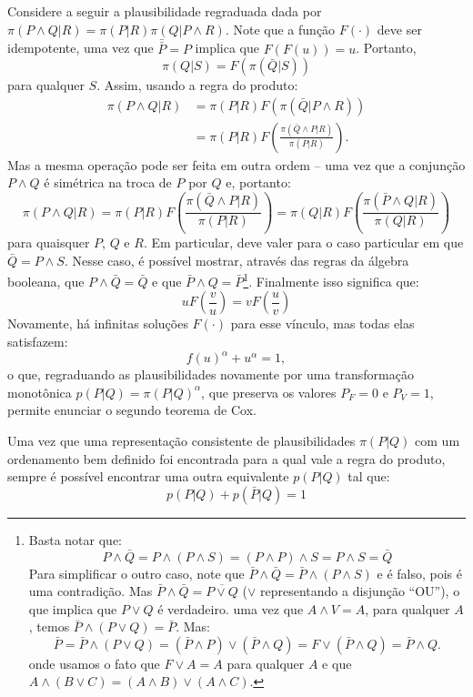 Considere a seguir a plausibilidade regraduada dada por $\pi(P \wedge Q | R) = \pi(P|R) \pi(Q|P \wedge R)$. Note que a função $F(\cdot)$ deve ser idempotente, uma vez que $\bar{\bar{P}} = P$ implica que $F(F(u)) = u$. Portanto, 
\[
\pi(Q|S) = F(\pi(\bar{Q}|S)) 
\]
para qualquer $S$. Assim, usando a regra do produto:
\begin{align}
\pi(P\wedge Q | R) &= \pi(P|R) F\left(\pi(\bar{Q}|P\wedge R)\right) \\
&= \pi(P|R) F\left(\frac{\pi(\bar{Q}\wedge P|R)}{\pi(P|R)}\right).
\end{align}
Mas a mesma operação pode ser feita em outra ordem -- uma vez que a conjunção $P\wedge Q$ é simétrica na troca de $P$ por $Q$ e, portanto:
\[
\pi(P\wedge Q | R) = \pi(P|R) F\left(\frac{\pi(\bar{Q}\wedge P|R)}{\pi(P|R)}\right) = \pi(Q|R) F\left(\frac{\pi(\bar{P}\wedge Q|R)}{\pi(Q|R)}\right)
\]
para quaisquer $P$, $Q$ e $R$. Em particular, deve valer para o caso particular em que $\bar{Q} = {P\wedge S}$. Nesse caso, é possível mostrar, através das regras da álgebra booleana, que $P\wedge\bar{Q} = \bar{Q}$ e que $\bar{P}\wedge Q = \bar{P}$\footnote{Basta notar que:
\[
  P\wedge\bar{Q} = P \wedge (P\wedge S)= (P \wedge P)\wedge S = P\wedge S = \bar{Q}
\]
Para simplificar o outro caso, note que $\bar{P}\wedge \bar{Q} =\bar{P}\wedge (P\wedge S)$ e é falso, pois é uma contradição. Mas $\bar{P}\wedge \bar{Q} = \overline{P\vee Q}$ ($\vee$ representando a disjunção ``OU''), o que implica que $P\vee Q$ é verdadeiro. uma vez que $A\wedge V = A$, para qualquer $A$, temos $\bar{P}\wedge(P\vee Q) = \bar{P}$. Mas:
\[
\bar{P} = \bar{P}\wedge(P\vee Q) = (\bar{P}\wedge P) \vee (\bar{P}\wedge Q) = F \vee (\bar{P} \wedge Q) = \bar{P} \wedge Q.
\]
onde usamos o fato que $F \vee A = A$ para qualquer $A$ e que $A\wedge (B\vee C) = (A\wedge B) \vee (A\wedge C)$.}. Finalmente isso significa que:
\[
u F\left(\frac{v}{u}\right) = v F\left(\frac{u}{v}\right)
\]
Novamente, há infinitas soluções $F(\cdot)$ para esse vínculo, mas todas elas satisfazem\cite{Aczel1975, ACaticha2008}:
\begin{equation}
 f(u)^\alpha + u^\alpha = 1, 
\end{equation}
o que, regraduando as plausibilidades novamente por uma transformação monotônica $p(P|Q) = \pi(P|Q)^\alpha$, que preserva os valores $P_F = 0$ e $P_V = 1$, permite enunciar o segundo teorema de Cox.
\begin{Teorema}
 Uma vez que uma representação consistente de plausibilidades $\pi(P|Q)$ com um ordenamento bem definido foi encontrada para a qual vale a regra do produto, sempre é possível encontrar uma outra equivalente $p(P|Q)$ tal que:
 \begin{equation}
 p(P|Q) + p(\bar{P} | Q) = 1 
 \end{equation}
\end{Teorema}
